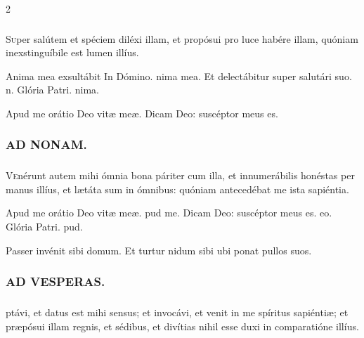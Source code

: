 \documentclass[9pt,twoside]{extarticle}
\begin{document}
\begin{multicols}{2}
\subsubsection*{}
\lettrine{S}uper salútem et spéciem diléxi illam, et propósui pro luce habére illam, quóniam inexstinguíbile est lumen illíus.

\begin{tightlist}{}
\item {} Anima mea exsultábit \textred{*} In Dómino. nima mea.  Et delectábitur super salutári suo. n. Glória Patri. nima.
\item {} Apud me orátio Deo vitæ meæ.  Dicam Deo: suscéptor meus es.
\end{tightlist}

\subsubsection*{\center \textsc{AD NONAM.}}
\subsubsection*{}
\lettrine{V}enérunt autem mihi ómnia bona páriter cum illa, et innumerábilis honéstas per manus illíus, et lætáta sum in ómnibus: quóniam antecedébat me ista sapiéntia.

\begin{tightlist}{}
\item {} Apud me orátio \textred{*} Deo vitæ meæ. pud me.  Dicam Deo: suscéptor meus es. eo. Glória Patri. pud.
\item {} Passer invénit sibi domum.  Et turtur nidum sibi ubi ponat pullos suos.
\end{tightlist}

\subsubsection*{\center \textsc{AD VESPERAS.}}
\begin{tightlist}{}
\item {}
\end{tightlist}

\subsubsection*{}
ptávi, et datus est mihi sensus; et invocávi, et venit in me spíritus sapiéntiæ; et præpósui illam regnis, et sédibus, et divítias nihil esse duxi in comparatióne illíus.


\end{multicols}
\end{document}
